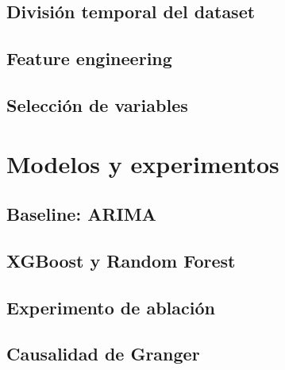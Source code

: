 \subsection{División temporal del dataset}

\subsection{Feature engineering}

\subsection{Selección de variables}

\section{Modelos y experimentos}

\subsection{Baseline: ARIMA}

\subsection{XGBoost y Random Forest}

\subsection{Experimento de ablación}

\subsection{Causalidad de Granger}

